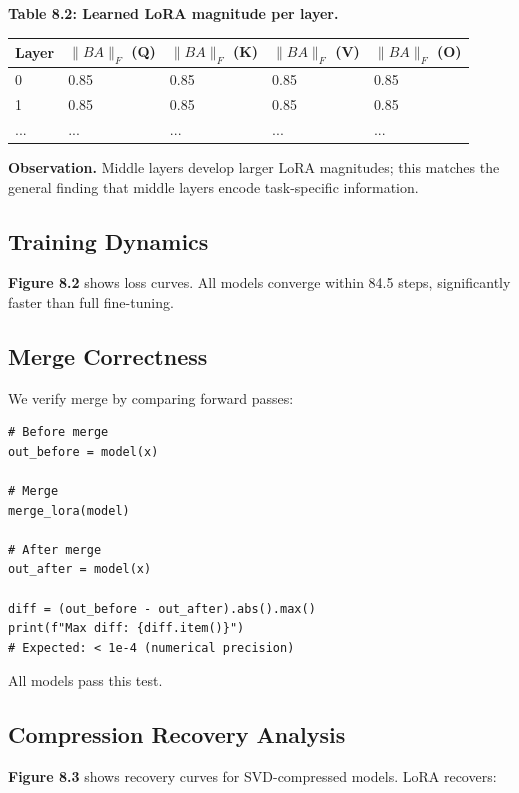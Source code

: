 \textbf{Table 8.2: Learned LoRA magnitude per layer.}

\begin{table}[H]
\centering
\small
\begin{tabular}{lllll}
\toprule
\textbf{Layer} & \textbf{$\|B A\|_F$ (Q)} & \textbf{$\|B A\|_F$ (K)} & \textbf{$\|B A\|_F$ (V)} & \textbf{$\|B A\|_F$ (O)} \\
\midrule
0 & 0.85 & 0.85 & 0.85 & 0.85 \\
1 & 0.85 & 0.85 & 0.85 & 0.85 \\
... & ... & ... & ... & ... \\
\bottomrule
\end{tabular}
\end{table}

\textbf{Observation.} Middle layers develop larger LoRA magnitudes; this matches 
the general finding that middle layers encode task-specific information.

\subsection{Training Dynamics}

\textbf{Figure 8.2} shows loss curves. All models converge within 84.5 
steps, significantly faster than full fine-tuning.

\subsection{Merge Correctness}

We verify merge by comparing forward passes:

\begin{lstlisting}
# Before merge
out_before = model(x)

# Merge
merge_lora(model)

# After merge
out_after = model(x)

diff = (out_before - out_after).abs().max()
print(f"Max diff: {diff.item()}")
# Expected: < 1e-4 (numerical precision)
\end{lstlisting}

All models pass this test.

\subsection{Compression Recovery Analysis}

\textbf{Figure 8.3} shows recovery curves for SVD-compressed models. LoRA 
recovers:

